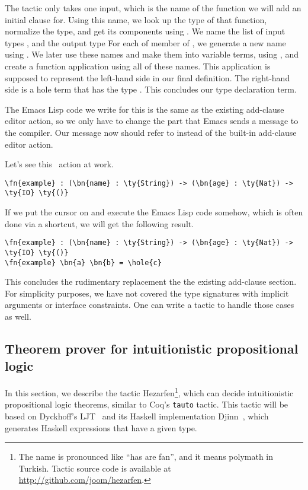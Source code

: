 The  tactic only takes one input, which is the name of the function
we will add an initial clause for.
Using this name, we look up the type of that function,
normalize the type, and get its components
using .
We name the list of input types , and the output type 
For each of member of , we generate a new name using
. We later use these names and make them
into variable terms, using , and create a function application using
all of these names. This application is supposed to represent the left-hand
side in our final definition. The right-hand side is a hole term that has the
type .  This concludes our type declaration term.

The Emacs Lisp code we write for this is the same as the existing add-clause
editor action, so we only have to change the part that Emacs sends a message to
the compiler. Our message now should refer to  instead of the
built-in add-clause editor action.

Let's see this \Elab\ action at work.

\begin{Verbatim}
\fn{example} : (\bn{name} : \ty{String}) -> (\bn{age} : \ty{Nat}) -> \ty{IO} \ty{()}
\end{Verbatim}

If we put the cursor on  and execute the Emacs Lisp code somehow,
which is often done via a shortcut, we will get the following result.

\begin{Verbatim}
\fn{example} : (\bn{name} : \ty{String}) -> (\bn{age} : \ty{Nat}) -> \ty{IO} \ty{()}
\fn{example} \bn{a} \bn{b} = \hole{c}
\end{Verbatim}

This concludes the rudimentary replacement the the existing add-clause section.
For simplicity purposes, we have not covered the type signatures with implicit
arguments or interface constraints. One can write a tactic to handle
those cases as well.

\subsection{Theorem prover for intuitionistic propositional logic}\label{sec:hezarfen}

In this section, we describe the tactic Hezarfen\footnote{ The name is
  pronounced like ``has are fan'', and it means
    polymath in Turkish.  Tactic source code is available at
    \url{http://github.com/joom/hezarfen}.}, which can decide intuitionistic
propositional logic theorems, similar to Coq's \texttt{tauto} tactic.
This tactic will be based on Dyckhoff's LJT~\cite{ljt} and its Haskell
implementation Djinn~\cite{djinn}, which generates Haskell expressions
that have a given type.

